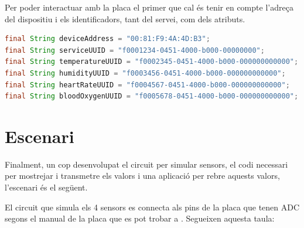 Per poder interactuar amb la placa el primer que cal és tenir en compte l'adreça del dispositiu i els identificadors, tant del servei, com dels atributs.

\begin{lstlisting}[language=JAVA]
final String deviceAddress = "00:81:F9:4A:4D:B3";
final String serviceUUID = "f0001234-0451-4000-b000-00000000";
final String temperatureUUID = "f0002345-0451-4000-b000-000000000000";
final String humidityUUID = "f0003456-0451-4000-b000-000000000000";
final String heartRateUUID = "f0004567-0451-4000-b000-000000000000";
final String bloodOxygenUUID = "f0005678-0451-4000-b000-000000000000";
\end{lstlisting}


\section{Escenari}
Finalment, un cop desenvolupat el circuit per simular sensors, el codi necessari per mostrejar i transmetre els valors i una aplicació per rebre aquests valors, l'escenari és el següent.

El circuit que simula els 4 sensors es connecta als pins de la placa que tenen ADC segons el manual de la placa que es pot trobar a \cite{manual_placa}.
Segueixen aquesta taula:
